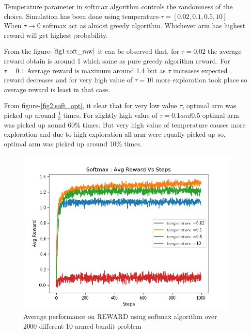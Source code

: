 \documentclass[preprint,12pt]{elsarticle}
\begin{document}
 	 
	Temperature parameter  in softmax algorithm controls the randomness of the choice. Simulation has been done using temperature-$\tau =[0.02,0.1,0.5,10]$.  When $\tau \rightarrow 0$ softmax act as almost greedy algorithm. Whichever arm has highest reward will get highest probability. 
 	 
 	 
 	 From the figure-$\ref{fig1:soft_raw}$ it can be observed that, for $\tau=0.02$ the average reward obtain is around 1 which same as pure greedy algorithm reward. For $\tau=0.1$ Average reward is maximum around 1.4 but as $\tau$ increases expected reward decreases and for very high value of $\tau=10$ more exploration took place so average reward is least in that case.
 	 
 	 From figure-\ref{fig2:soft_opt}, it clear that for very low value $\tau$, optimal arm was picked up around $\frac{1}{3}$ times. For slightly high value of $\tau = 0.1 and 0.5$ optimal arm was picked up aound 60\% times. But very high value of temperature causes more exploration and due to high exploration all arm were equally picked up so, optimal arm was picked up around 10\% times.
 	 
 	 \begin{figure}[H]
 	 	\centering
 	 	\includegraphics[scale=0.7]{./reward_soft.jpg}
 	 	\hspace{0.25cm}
 	 	\caption{Average performance on REWARD using softmax algorithm over 2000 different 10-armed bandit problem}
 	 	\label{fig1:soft_raw}
 	 \end{figure}
 	 
\end{document}

